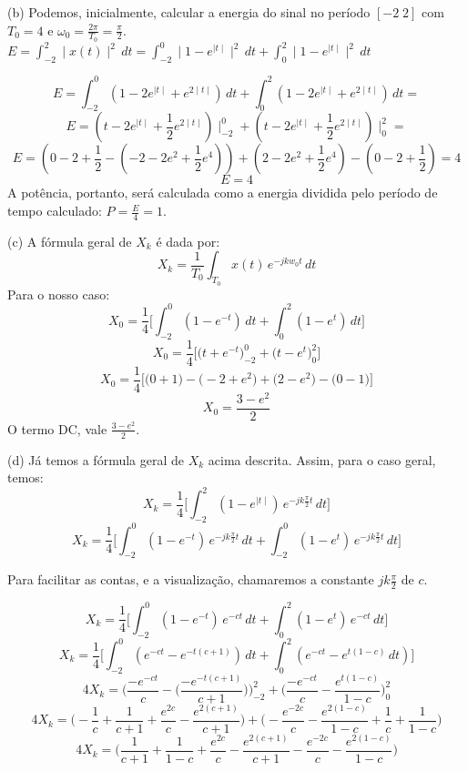 \documentclass{article}
\begin{document}
\vspace{\baselineskip}

(b) Podemos, inicialmente, calcular a energia do sinal no período $[-2\;2]$ com $T_{0} = 4$ e $\omega_{0} = \frac{2 \pi}{T_{0}} = \frac{\pi}{2}$.\\
$E = \int_{-2}^{2} \mid x(t) \mid ^{2}\,dt = \int_{-2}^{0} \mid 1 - e^{\mid t\mid} \mid^{2}\,dt + \int_{0}^{2} \mid 1 - e^{\mid t\mid} \mid^{2}\,dt$

\[E = \int_{-2}^{0} (1 - 2e^{\mid t \mid} + e^{2\mid t \mid})\,dt + \int_{0}^{2} (1 - 2e^{\mid t \mid} + e^{2\mid t \mid})\,dt =\]
\[E = (t - 2e^{\mid t \mid} + \frac{1}{2}e^{2 \mid t \mid}) \mid_{-2}^{0} + (t - 2e^{\mid t \mid} + \frac{1}{2}e^{2 \mid t \mid}) \mid_{0}^{2} = \]
\[E = (0 -2 + \frac{1}{2} - (-2 - 2e^{2} + \frac{1}{2}e^{4})) + (2 - 2e^{2} + \frac{1}{2}e^{4}) - (0 -2 + \frac{1}{2}) = 4\]
\[E = 4\]
A potência, portanto, será calculada como a energia dividida pelo período de tempo calculado: $P = \frac{E}{4} = 1$.

\vspace{\baselineskip}

(c) A fórmula geral de $X_{k}$ é dada por:
\[X_{k} = \frac{1}{T_{0}} \int_{T_{0}} x(t)\,e^{-jkw_{0}t}\,dt\]
Para o nosso caso:
\[X_{0} = \frac{1}{4} \biggl[\int_{-2}^{0} (1 - e^{-t})\,dt + \int_{0}^{2} (1 - e^{t})\,dt\biggr]\]
\[X_{0} = \frac{1}{4} \biggl[\bigl(t + e^{-t}\bigr)_{-2}^{0} + \bigl(t - e^{t}\bigr)_{0}^{2}\biggr]\]
\[X_{0} = \frac{1}{4} \biggl[\bigl(0 + 1\bigr) - \bigl(-2 + e^{2}\bigr) + \bigl(2 - e^{2}\bigr) - \bigl(0 - 1\bigr)\biggr]\]
\[X_{0} = \frac{3 - e^{2}}{2}\]
O termo DC, vale $\frac{3 - e^{2}}{2}$.

\vspace{\baselineskip}

(d) Já temos a fórmula geral de $X_{k}$ acima descrita. Assim, para o caso geral, temos:
\[X_{k} = \frac{1}{4}\biggl[\int_{-2}^{2} (1 - e^{\mid t \mid})\,e^{-jk\frac{\pi}{2}t}\,dt\biggr]\]
\[X_{k} = \frac{1}{4}\biggl[\int_{-2}^{0} (1 - e^{-t})\,e^{-jk\frac{\pi}{2}t}\,dt + \int_{-2}^{0} (1 - e^{t})\,e^{-jk\frac{\pi}{2}t}\,dt\biggr]\]

\vspace{\baselineskip}

Para facilitar as contas, e a visualização, chamaremos a constante $jk\frac{\pi}{2}$ de $c$.

\vspace{\baselineskip}

\[X_{k} = \frac{1}{4} \biggl[\int_{-2}^{0} (1 - e^{-t})\,e^{-ct}\,dt + \int_{0}^{2} (1 - e^{t})\,e^{-ct}\,dt\biggr]\]
\[X_{k} = \frac{1}{4} \biggl[\int_{-2}^{0} (e^{-ct} - e^{-t(c + 1)})\,dt + \int_{0}^{2} (e^{-ct} - e^{t(1 - c)}\,dt)\biggr]\]
\[4X_{k} = \Biggl(\frac{-e^{-ct}}{c} - \biggl(\frac{-e^{-t(c+1)}}{c + 1}\biggr)\Biggr)_{-2}^{2} + \Biggl(\frac{-e^{-ct}}{c} - \frac{e^{t(1 - c)}}{1 - c}\Biggr)_{0}^{2}\]
\[4X_{k} = \Biggl(-\frac{1}{c} + \frac{1}{c + 1} + \frac{e^{2c}}{c} - \frac{e^{2(c + 1)}}{c + 1}\Biggr) + \Biggl(- \frac{e^{-2c}}{c} - \frac{e^{2(1 - c)}}{1 - c} + \frac{1}{c} + \frac{1}{1-c}\Biggr)\]
\[4X_{k} = \Biggl(\frac{1}{c + 1} + \frac{1}{1-c} + \frac{e^{2c}}{c} - \frac{e^{2(c + 1)}}{c + 1} - \frac{e^{-2c}}{c} - \frac{e^{2(1 - c)}}{1 - c} \Biggr)\]
\end{document}
